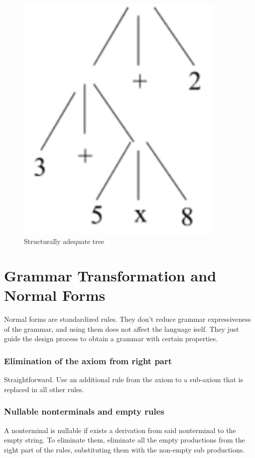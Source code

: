 \begin{figure}
\begin{minipage}{0.45\textwidth}
						\includegraphics[width=0.9\textwidth]{./images/structAdeq2.png} 
				    	\caption{Structurally adequate tree}
					\end{minipage}
				\end{figure}
			
	\section{Grammar Transformation and Normal Forms}
		Normal forms are standardized rules. They don't reduce grammar expressiveness of the grammar, and using them does not affect the language iself. They just guide the design process to obtain a grammar with certain properties.\\
		\subsubsection{Elimination of the axiom from right part}
			Straightforward. Use an additional rule from the axiom to a sub-axiom that is replaced in all other rules.\\
		\subsubsection{Nullable nonterminals and empty rules}
			A nonterminal is nullable if exists a derivation from said nonterminal to the empty string. To eliminate them, eliminate all the empty productions from the right part of the rules, substituting them with the non-empty sub productions.
